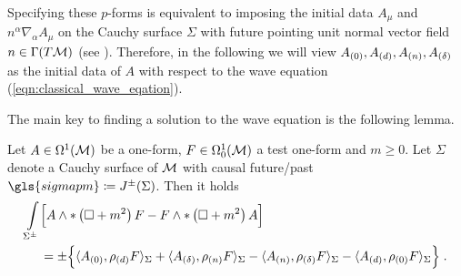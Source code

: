 Specifying these $p$-forms is equivalent to imposing the initial data $A_\mu$ and $n^\alpha \nabla_\alpha A_\mu$ on the Cauchy surface $\Sigma$ with future pointing unit normal vector field $n \in \Gamma(T\mathcal{M})$ (see \cite[Chapter III]{FURLANI}). Therefore, in the following we will view ${A_{(0)}},{A_{(d)}}, {A_{(n)}}, {A_{(\delta)}}$ as the initial data of $A$ with respect to the wave equation (\ref{eqn:classical_wave_eqation}).\par
The main key to finding a solution to the wave equation is the following lemma.
%
%
\begin{lemma}
 Let $A \in \Omega^1(\mathcal{M})$ be a one-form, $F \in \Omega^1_0(\mathcal{M})$ a test one-form and $m \geq 0$.
 Let $\Sigma$ denote a Cauchy surface of $\mathcal{M}$ with causal future/past  $\gls{sigmapm} \coloneqq J^\pm (\Sigma)$.
 Then it holds
 \begin{align}
  \int\limits_{\Sigma^\pm} &\Big[ A \wedge * \left( \square + m^2 \right) F - F \wedge *  \left( \square + m^2 \right) A \Big]  \label{eqn:greens_identity} \\
  &= \pm \Big\{ \langle {A_{(0)}} , \rho_{(d)} F\rangle_\Sigma
  +\langle {A_{(\delta)}} , \rho_{(n)} F\rangle_\Sigma
  -\langle {A_{(n)}} , \rho_{(\delta)} F\rangle_\Sigma
  -\langle {A_{(d)}} , \rho_{(0)} F\rangle_\Sigma \Big\}   \;. \notag
 \end{align}
\label{lem:greens_identity}
\end{lemma}
%
%
